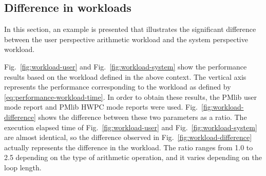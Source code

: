 \documentclass[conference]{IEEEtran}
\begin{document}
%
\subsection{Difference in workloads}
\label{subsection:difference-in-workloads}

In this section, an example is presented that illustrates the significant
difference between the user perspective arithmetic workload and
the system perspective workload.

Fig.~\ref{fig:workload-user} and Fig.~\ref{fig:workload-system} show
the performance results based on the workload defined in the above context.
The vertical axis represents the performance corresponding to the workload as
defined by \eqref{eq:performance-workload-time}.
In order to obtain these results, the PMlib user mode report and PMlib HWPC
mode reports were used.
Fig.~\ref{fig:workload-difference} shows the difference between these two
parameters as a ratio.
%
%
The execution elapsed time
of Fig.~\ref{fig:workload-user} and Fig.~\ref{fig:workload-system} are
almost identical, so the difference observed in
Fig.~\ref{fig:workload-difference} 
actually represents the difference in the workload.
The ratio ranges from 1.0 to 2.5 depending on the type of
arithmetic operation, and it varies depending on the loop length.
\end{document}
